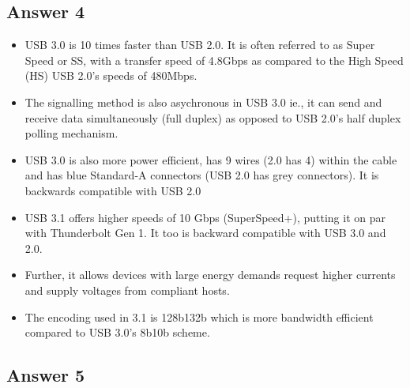 \documentclass[]{article}
\begin{document}
\subsection{Answer 4}\label{answer-4}

\begin{itemize}
\itemsep1pt\parskip0pt
\item
  USB 3.0 is 10 times faster than USB 2.0. It is often referred to as
  Super Speed or SS, with a transfer speed of 4.8Gbps as compared to the
  High Speed (HS) USB 2.0's speeds of 480Mbps.
\item
  The signalling method is also asychronous in USB 3.0 ie., it can send
  and receive data simultaneously (full duplex) as opposed to USB 2.0's
  half duplex polling mechanism.
\item
  USB 3.0 is also more power efficient, has 9 wires (2.0 has 4) within
  the cable and has blue Standard-A connectors (USB 2.0 has grey
  connectors). It is backwards compatible with USB 2.0
\item
  USB 3.1 offers higher speeds of 10 Gbps (SuperSpeed+), putting it on
  par with Thunderbolt Gen 1. It too is backward compatible with USB 3.0
  and 2.0.
\item
  Further, it allows devices with large energy demands request higher
  currents and supply voltages from compliant hosts.
\item
  The encoding used in 3.1 is 128b132b which is more bandwidth efficient
  compared to USB 3.0's 8b10b scheme.
\end{itemize}

\subsection{Answer 5}\label{answer-5}
\end{document}
